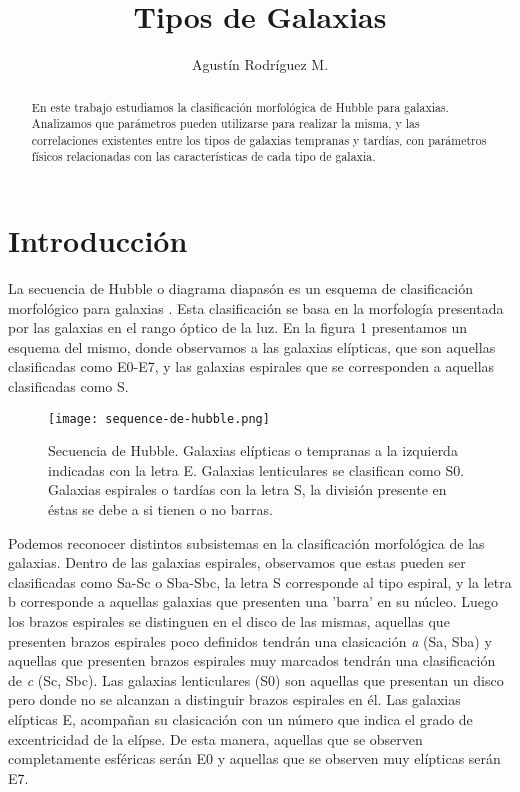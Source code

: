 \documentclass[a4paper,10pt]{article}
\title{Tipos de Galaxias}
\author{Agustín Rodríguez M.}
\begin{document}
\maketitle

\begin{abstract}
En este trabajo estudiamos la clasificaci\'on morfol\'ogica de Hubble para galaxias. Analizamos que par\'ametros pueden utilizarse para realizar la misma, y las correlaciones existentes entre los tipos de galaxias tempranas y tard\'ias, con par\'ametros f\'isicos relacionadas con las caracter\'isticas de cada tipo de galaxia. 
\end{abstract}



\section{Introducci\'on}

La secuencia de Hubble o diagrama diapasón es un esquema de clasificación morfol\'ogico para galaxias \citep{Hubble1926}. Esta clasificación se basa en la morfolog\'ia presentada por las galaxias en el rango óptico de la luz. En la figura 1 presentamos un esquema del mismo, donde observamos a las galaxias el\'ipticas, que son aquellas clasificadas como E0-E7, y las galaxias espirales que se corresponden a aquellas clasificadas como S.

\begin{figure}[h]
 \centering
 \texttt{[image: sequence-de-hubble.png]}
 \caption{Secuencia de Hubble. Galaxias el\'ipticas o tempranas a la izquierda indicadas con la letra E. Galaxias lenticulares se clasifican como S0. Galaxias espirales o tard\'ias con la letra S, la divisi\'on presente en \'estas se debe a si tienen o no barras.}
 \label{fig: 1}
\end{figure}


Podemos reconocer distintos subsistemas en la clasificaci\'on morfol\'ogica de las galaxias. Dentro de las galaxias espirales, observamos que estas pueden ser clasificadas como Sa-Sc o Sba-Sbc, la letra S corresponde al tipo espiral, y la letra b corresponde a aquellas galaxias que presenten una 'barra' en su núcleo. Luego los brazos espirales se distinguen en el disco de las mismas, aquellas que presenten brazos espirales poco definidos tendr\'an una clasicación \textit{a} (Sa, Sba) y aquellas que presenten brazos espirales muy marcados tendr\'an una clasificación de \textit{c} (Sc, Sbc). Las galaxias lenticulares (S0) son aquellas que presentan un disco pero donde no se alcanzan a distinguir brazos espirales en \'el. Las galaxias elípticas E, acompañan su clasicación con un número que indica el grado de excentricidad de la elípse. De esta manera, aquellas que se observen completamente esf\'ericas ser\'an E0 y aquellas que se observen muy el\'ipticas ser\'an E7. 
\end{document}
